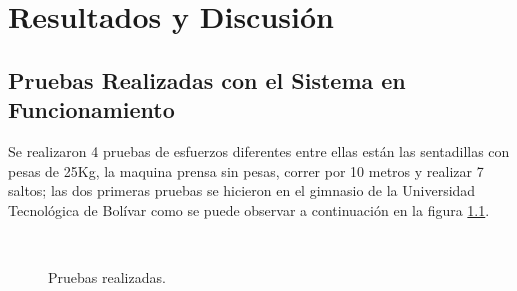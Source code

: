 \chapter{Resultados y Discusión} \label{sec:Resultados}

\section{Pruebas Realizadas con el Sistema en Funcionamiento}

Se realizaron 4 pruebas de esfuerzos diferentes entre ellas están las sentadillas con pesas de 25Kg, la maquina prensa sin pesas, correr por 10 metros y realizar 7 saltos; las dos primeras pruebas se hicieron en el gimnasio de la Universidad Tecnológica de Bolívar como se puede observar a continuación en la figura \ref{fig:Pruebas}.

\begin{figure}[H]
 \centering
    \\
 \caption{Pruebas realizadas.}
 \label{fig:Pruebas}
\end{figure}

